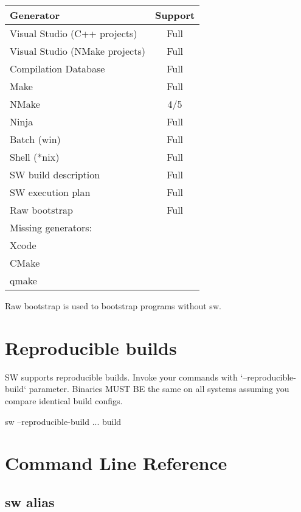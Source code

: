 \begin{center}
\begin{tabular}{lc}
Generator & Support\\
\hline
Visual Studio (C++ projects) & Full \\
Visual Studio (NMake projects) & Full \\
Compilation Database & Full \\
Make & Full \\
NMake & 4/5 \\ %
Ninja & Full \\
Batch (win) & Full \\
Shell (*nix) & Full \\
SW build description & Full \\
SW execution plan & Full \\
Raw bootstrap & Full \\
\hline

Missing generators: & \\
Xcode & \\
CMake & \\
qmake & \\

\hline
\end{tabular}
\end{center}


Raw bootstrap is used to bootstrap programs without sw.


\section{Reproducible builds}

SW supports reproducible builds.
Invoke your commands with `--reproducible-build` parameter.
Binaries MUST BE the same on all systems assuming you compare identical build configs.

\begin{command}
sw --reproducible-build ... build
\end{command}


\section{Command Line Reference}

\subsection{sw alias}

